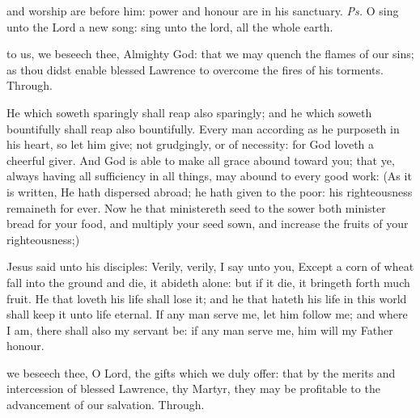 \introit
{} and worship are before him: power and honour are in his sanctuary. \textit{Ps.} O sing unto the Lord a new song: sing unto the lord, all the whole earth.

\collect
{} to us, we beseech thee, Almighty God: that we may quench the flames of our sins; as thou didst enable blessed Lawrence to overcome the fires of his torments. Through.

 He which soweth sparingly shall reap also sparingly; and he which soweth bountifully shall reap also bountifully. Every man according as he purposeth in his heart, so let him give; not grudgingly, or of necessity: for God loveth a cheerful giver. And God is able to make all grace abound toward you; that ye, always having all sufficiency in all things, may abound to every good work: (As it is written, He hath dispersed abroad; he hath given to the poor: his righteousness remaineth for ever. Now he that ministereth seed to the sower both minister bread for your food, and multiply your seed sown, and increase the fruits of your righteousness;)



 Jesus said unto his disciples: Verily, verily, I say unto you, Except a corn of wheat fall into the ground and die, it abideth alone: but if it die, it bringeth forth much fruit. He that loveth his life shall lose it; and he that hateth his life in this world shall keep it unto life eternal. If any man serve me, let him follow me; and where I am, there shall also my servant be: if any man serve me, him will my Father honour.


\secret
{} we beseech thee, O Lord, the gifts which we duly offer: that by the merits and intercession of blessed Lawrence, thy Martyr, they may be profitable to the advancement of our salvation. Through.


